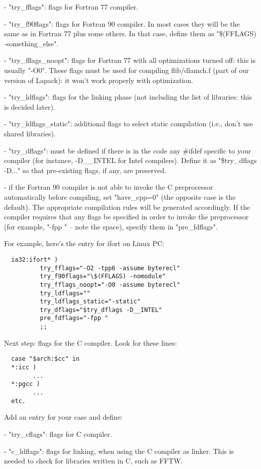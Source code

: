 \documentclass[12pt,a4paper]{article}
\begin{document}
\begin{enumerate}
- "try\_fflags": flags for Fortran 77 compiler.

- "try\_f90flags": flags for Fortran 90 compiler.
In most cases they will be the same as in Fortran 77 plus some
others.  In that case, define them as "\$(FFLAGS) -something\_else".

- "try\_fflags\_noopt": flags for Fortran 77 with all optimizations
turned off: this is usually "-O0".
These flags must be used for compiling flib/dlamch.f (part of our
version of Lapack): it won't work properly with optimization.

- "try\_ldflags": flags for the linking phase (not including the list
of libraries: this is decided later). 

- "try\_ldflags\_static": additional flags to select static compilation
(i.e., don't use shared libraries).

- "try\_dflags": must be defined if there is in the code any \#ifdef
specific to your compiler (for instance, -D\_\_INTEL for Intel
compilers).  Define it as "\$try\_dflags -D..." so that pre-existing
flags, if any, are preserved.

- if the Fortran 90 compiler is not able to invoke the C preprocessor
automatically before compiling, set "have\_cpp=0" (the opposite case
is the default). The appropriate compilation rules will be generated 
accordingly. If the compiler requires that any flags be specified in
order to invoke the preprocessor (for example, "-fpp " -- note the 
space), specify them in "pre\_fdflags".

For example, here's the entry for ifort on Linux PC:
\begin{verbatim}
  ia32:ifort* )
          try_fflags="-O2 -tpp6 -assume byterecl"
          try_f90flags="\$(FFLAGS) -nomodule"
          try_fflags_noopt="-O0 -assume byterecl"
          try_ldflags=""
          try_ldflags_static="-static"
          try_dflags="$try_dflags -D__INTEL"
          pre_fdflags="-fpp "
          ;;
\end{verbatim}
Next step: flags for the C compiler. Look for these lines:
\begin{verbatim}
  case "$arch:$cc" in
  *:icc )
        ...
  *:pgcc )
        ...
  etc.
\end{verbatim}
Add an entry for your case and define:

- "try\_cflags": flags for C compiler.

- "c\_ldflags": flags for linking, when using the C compiler as linker.
This is needed to check for libraries written in C, such as FFTW.


\end{enumerate}
\end{document}
